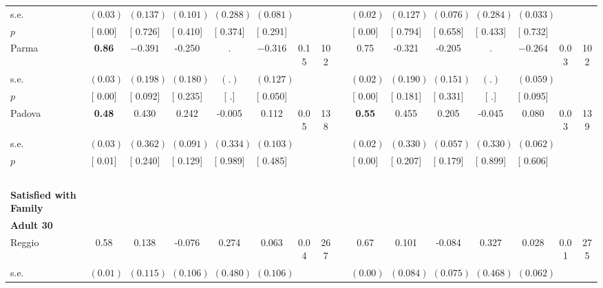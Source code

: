 \begin{longtable}{L{8em} c c c c c c c p{1em} c c c c c c c}
\quad \quad \quad \quad s.e.& $ (     0.03)$ & $ (    0.137)$ & $ (    0.101)$ & $ (    0.288)$ & $ (    0.081)$ & & & & $ (     0.02)$ & $ (    0.127)$ & $ (    0.076)$ & $ (    0.284)$ & $ (    0.033)$ & &  \\*
\quad \quad \quad \quad $ p$ & [     0.00] & [    0.726] & [    0.410] & [    0.374] & [    0.291] & & & & [     0.00] & [    0.794] & [    0.658] & [    0.433] & [    0.732] & &  \\[1em]
\quad \quad \quad Parma& \textbf{     0.86} & $ \mathbf{   -0.391}$ &    -0.250 &         . & $ \mathbf{   -0.316}$ &      0.15 &       102 & & 0.75 &    -0.321 &    -0.205 &         . & $ \mathbf{   -0.264}$ &      0.03 &       102  \\*
\quad \quad \quad \quad s.e.& $ (     0.03)$ & $ (    0.198)$ & $ (    0.180)$ & $ (        .)$ & $ (    0.127)$ & & & & $ (     0.02)$ & $ (    0.190)$ & $ (    0.151)$ & $ (        .)$ & $ (    0.059)$ & &  \\*
\quad \quad \quad \quad $ p$ & [     0.00] & [    0.092] & [    0.235] & [        .] & [    0.050] & & & & [     0.00] & [    0.181] & [    0.331] & [        .] & [    0.095] & &  \\[1em]
\quad \quad \quad Padova& \textbf{     0.48} &     0.430 &     0.242 &    -0.005 &     0.112 &      0.05 &       138 & & \textbf{     0.55} &     0.455 &     0.205 &    -0.045 &     0.080 &      0.03 &       139  \\*
\quad \quad \quad \quad s.e.& $ (     0.03)$ & $ (    0.362)$ & $ (    0.091)$ & $ (    0.334)$ & $ (    0.103)$ & & & & $ (     0.02)$ & $ (    0.330)$ & $ (    0.057)$ & $ (    0.330)$ & $ (    0.062)$ & &  \\*
\quad \quad \quad \quad $ p$ & [     0.01] & [    0.240] & [    0.129] & [    0.989] & [    0.485] & & & & [     0.00] & [    0.207] & [    0.179] & [    0.899] & [    0.606] & &  \\[1em]
~\\[1em]
\textbf{Satisfied with Family} \\*
\quad \quad \textbf{Adult 30} & & & & & & & & & & & & & & & \\* 
\quad \quad \quad Reggio& 0.58 &     0.138 &    -0.076 &     0.274 &     0.063 &      0.04 &       267 & & 0.67 &     0.101 &    -0.084 &     0.327 &     0.028 &      0.01 &       275  \\*
\quad \quad \quad \quad s.e.& $ (     0.01)$ & $ (    0.115)$ & $ (    0.106)$ & $ (    0.480)$ & $ (    0.106)$ & & & & $ (     0.00)$ & $ (    0.084)$ & $ (    0.075)$ & $ (    0.468)$ & $ (    0.062)$ & &  \\*

\end{longtable}
